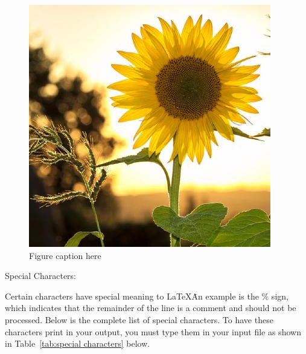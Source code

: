 \documentclass[a4paper,11pt,UTF8,openright]{book}
\begin{document}
\begin{figure}[!htbp]
  \centering
  \includegraphics[width=\textwidth]{29571453.jpg}
  \caption{Figure caption here}
  \label{fig:29571453.jpg}
\end{figure}

Special Characters:

Certain characters have special meaning to \LaTeX\. An example is the \% sign, which indicates that the remainder of the line is a comment and should not be processed. Below is the complete list of special characters. To have these characters print in your output, you must type them in your input file as shown in Table~\ref{tab:special characters} below.
\end{document}
